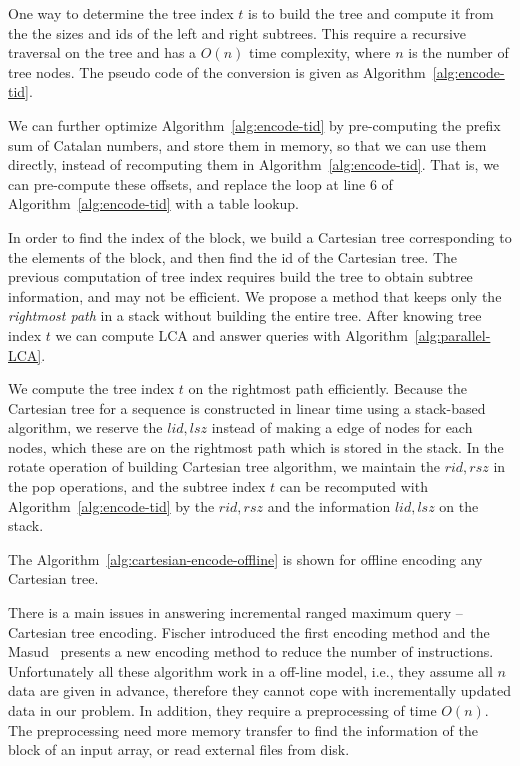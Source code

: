 
One way to determine the tree index $t$ is to build the tree and
compute it from the the sizes and ids of the left and right subtrees.
This require a recursive traversal on the tree and has a $O(n)$ time
complexity, where $n$ is the number of tree nodes.  The pseudo code of
the conversion is given as Algorithm~\ref{alg:encode-tid}.



We can further optimize Algorithm~\ref{alg:encode-tid} by
pre-computing the prefix sum of Catalan numbers, and store them in
memory, so that we can use them directly, instead of recomputing them
in Algorithm~\ref{alg:encode-tid}.  That is, we can pre-compute these
offsets, and replace the loop at line 6 of
Algorithm~\ref{alg:encode-tid} with a table lookup.


In order to find the index of the block, we build a Cartesian tree
corresponding to the elements of the block, and then find the id of the
Cartesian tree. The previous computation of tree index requires build
the tree to obtain subtree information, and may not be efficient.  We
propose a method that keeps only the {\em rightmost path} in a stack
without building the entire tree.  After knowing tree index $t$ we can
compute LCA and answer queries with Algorithm~\ref{alg:parallel-LCA}.

We compute the tree index $t$ on the rightmost path efficiently. Because
the Cartesian tree for a sequence is constructed in linear time using a
stack-based algorithm, we reserve the $\mathit{lid}, \mathit{lsz}$
instead of making a edge of nodes for each nodes, which these are on the
rightmost path which is stored in the stack.  In the rotate operation of
building Cartesian tree algorithm, we maintain the $\mathit{rid},
\mathit{rsz}$ in the pop operations, and the subtree index $t$ can be
recomputed with Algorithm~\ref{alg:encode-tid} by the $\mathit{rid},
\mathit{rsz}$ and the information $\mathit{lid}, \mathit{lsz}$ on the
stack.

The Algorithm~\ref{alg:cartesian-encode-offline} is shown for offline
encoding any Cartesian tree.




There is a main issues in answering incremental ranged maximum query --
Cartesian tree encoding.  Fischer introduced the first encoding method
and the Masud~\cite{Hasan2010CacheOA} presents a new encoding method to
reduce the number of instructions.  Unfortunately all these algorithm
work in a off-line model, i.e., they assume all $n$ data are given in
advance, therefore they cannot cope with incrementally updated data in
our problem.  In addition, they require a preprocessing of time $O(n)$.
The preprocessing need more memory transfer to find the information of
the block of an input array, or read external files from disk.


